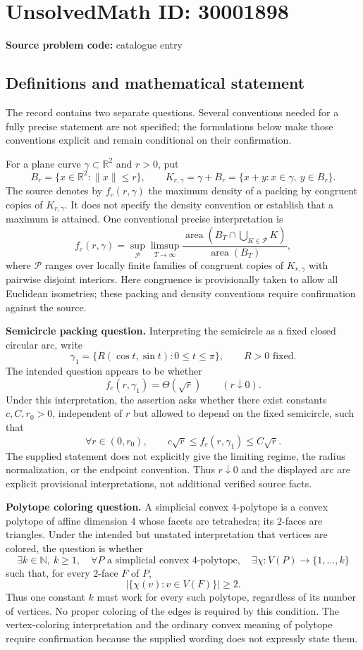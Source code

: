 \documentclass[11pt]{article}
\newcommand{\N}{\mathbb{N}}
\newcommand{\R}{\mathbb{R}}
\begin{document}
\section*{UnsolvedMath ID: 30001898}
\textbf{Source problem code:} catalogue entry
\subsection{Definitions and mathematical statement}
The record contains two separate questions. Several conventions needed for a fully precise statement are not specified; the formulations below make those conventions explicit and remain conditional on their confirmation.

For a plane curve \(\gamma\subset\R^2\) and \(r>0\), put
\[
B_r=\{x\in\R^2:\|x\|\le r\},\qquad K_{r,\gamma}=\gamma+B_r=\{x+y:x\in\gamma,\ y\in B_r\}.
\]
The source denotes by \(f_c(r,\gamma)\) the maximum density of a packing by congruent copies of \(K_{r,\gamma}\). It does not specify the density convention or establish that a maximum is attained. One conventional precise interpretation is
\[
f_c(r,\gamma)=\sup_{\mathcal P}\limsup_{T\to\infty}\frac{\operatorname{area}\!\left(B_T\cap\bigcup_{K\in\mathcal P}K\right)}{\operatorname{area}(B_T)},
\]
where \(\mathcal P\) ranges over locally finite families of congruent copies of \(K_{r,\gamma}\) with pairwise disjoint interiors. Here congruence is provisionally taken to allow all Euclidean isometries; these packing and density conventions require confirmation against the source.

\textbf{Semicircle packing question.} Interpreting the semicircle as a fixed closed circular arc, write
\[
\gamma_1=\{R(\cos t,\sin t):0\le t\le\pi\},\qquad R>0\text{ fixed}.
\]
The intended question appears to be whether
\[
f_c(r,\gamma_1)=\Theta(\sqrt r)\qquad(r\downarrow0).
\]
Under this interpretation, the assertion asks whether there exist constants \(c,C,r_0>0\), independent of \(r\) but allowed to depend on the fixed semicircle, such that
\[
\forall r\in(0,r_0),\qquad c\sqrt r\le f_c(r,\gamma_1)\le C\sqrt r.
\]
The supplied statement does not explicitly give the limiting regime, the radius normalization, or the endpoint convention. Thus \(r\downarrow0\) and the displayed arc are explicit provisional interpretations, not additional verified source facts.

\textbf{Polytope coloring question.} A simplicial convex \(4\)-polytope is a convex polytope of affine dimension \(4\) whose facets are tetrahedra; its \(2\)-faces are triangles. Under the intended but unstated interpretation that vertices are colored, the question is whether
\[
\exists k\in\N,\ k\ge1,\quad\forall P\text{ a simplicial convex }4\text{-polytope},\quad\exists\chi:V(P)\to\{1,\ldots,k\}
\]
such that, for every \(2\)-face \(F\) of \(P\),
\[
\left|\{\chi(v):v\in V(F)\}\right|\ge2.
\]
Thus one constant \(k\) must work for every such polytope, regardless of its number of vertices. No proper coloring of the edges is required by this condition. The vertex-coloring interpretation and the ordinary convex meaning of polytope require confirmation because the supplied wording does not expressly state them.
\end{document}
